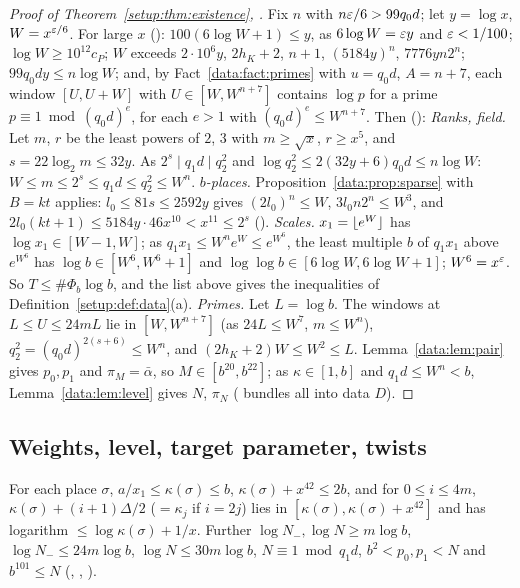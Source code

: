 \begin{proof}[Proof of Theorem~\ref{setup:thm:existence}, ]
Fix $n$ with $n\varepsilon/6 > 99q_0d$; let $y = \log x$, $W = x^{\varepsilon/6}$. For large $x$
(): $100(6\log W + 1) \le y$, as
$6\log W = \varepsilon y$ and $\varepsilon < 1/100$; $\log W \ge 10^{12}c_P$; $W$ exceeds $2\cdot10^6y$,
$2h_K+2$, $n+1$, $(5184y)^n$, $7776yn2^n$; $99q_0dy \le n\log W$; and, by
Fact~\ref{data:fact:primes} with $u = q_0d$, $A = n+7$, each window $[U, U+W]$ with
$U \in [W, W^{n+7}]$ contains $\log p$ for a prime $p \equiv 1 \bmod (q_0d)^e$, for each $e > 1$
with $(q_0d)^e \le W^{n+7}$. Then
():
\emph{Ranks, field.} Let $m$, $r$ be the least powers of $2$, $3$ with $m \ge \sqrt x$,
$r \ge x^5$, and $s = 22\log_2m \le 32y$. As $2^s \mid q_1d \mid q_2^2$ and
$\log q_2^2 \le 2(32y+6)q_0d \le n\log W$: $W \le m \le 2^s \le q_1d \le q_2^2 \le W^n$.
\emph{$b$-places.} Proposition~\ref{data:prop:sparse} with $B = kt$ applies: $l_0 \le 81s \le 2592y$
gives $(2l_0)^n \le W$, $3l_0n2^n \le W^3$, and $2l_0(kt+1) \le 5184y\cdot46x^{10} < x^{11} \le 2^s$
().
\emph{Scales.} $x_1 = \lfloor e^W\rfloor$ has $\log x_1 \in [W-1, W]$; as $q_1x_1 \le W^ne^W \le e^{W^6}$,
the least multiple $b$ of $q_1x_1$ above $e^{W^6}$ has $\log b \in [W^6, W^6+1]$ and
$\log\log b \in [6\log W, 6\log W+1]$; $W^6 = x^\varepsilon$. So $T \le \#\Phi_b\log b$, and the list
above gives the inequalities of Definition~\ref{setup:def:data}(a).
\emph{Primes.} Let $L = \log b$. The windows at $L \le U \le 24mL$ lie in $[W, W^{n+7}]$ (as
$24L \le W^7$, $m \le W^n$), $q_2^2 = (q_0d)^{2(s+6)} \le W^n$, and $(2h_K+2)W \le W^2 \le L$.
Lemma~\ref{data:lem:pair} gives $p_0, p_1$ and $\pi_M = \bar\alpha$, so $M \in [b^{20}, b^{22}]$;
as $\kappa \in [1, b]$ and $q_1d \le W^n < b$, Lemma~\ref{data:lem:level} gives $N$, $\pi_N$
( bundles all into data $D$).
\end{proof}

\subsection{Weights, level, target parameter, twists}

\begin{lemma}
\label{data:lem:N}
For each place $\sigma$, $a/x_1 \le \kappa(\sigma) \le b$, $\kappa(\sigma) + x^{42} \le 2b$, and for
$0 \le i \le 4m$, $\kappa(\sigma) + (i+1)\Delta/2$ ($= \kappa_j$ if $i = 2j$) lies in
$[\kappa(\sigma), \kappa(\sigma)+x^{42}]$ and has logarithm $\le \log\kappa(\sigma) + 1/x$. Further
$\log N_-, \log N \ge m\log b$, $\log N_- \le 24m\log b$, $\log N \le 30m\log b$,
$N \equiv 1 \bmod q_1d$, $b^2 < p_0, p_1 < N$ and $b^{101} \le N$ (,
, ).
\end{lemma}

